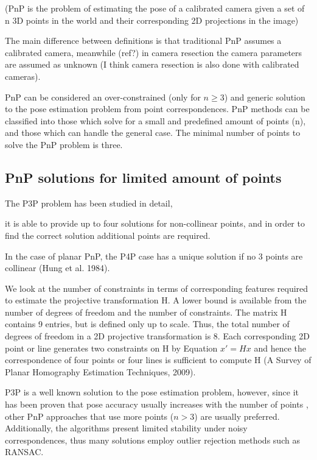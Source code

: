 \documentclass[letterpaper, 10 pt, conference]{ieeeconf}  %
\begin{document}
	(PnP is the problem of estimating the pose of a calibrated camera given a set of n 3D points in the world and their corresponding 2D projections in the image)
	
	The main difference between definitions is that traditional PnP assumes a calibrated camera, meanwhile (ref?) in camera resection the camera parameters are assumed as unknown (I think camera resection is also done with calibrated cameras). 
	
	PnP can be considered an over-constrained (only for $n \geq 3$) and generic solution to the pose estimation problem from point correspondences. PnP methods can be classified into those which solve for a small and predefined amount of points (n), and those which can handle the general case. The minimal number of points to solve the PnP problem is three.
	
	
	\subsection{PnP solutions for limited amount of points}
	The P3P problem has been studied in detail,
	
	
	it is able to provide up to four solutions for non-collinear points, and in order to find the correct solution additional points are required.
	
	
	In the case of planar PnP, the P4P case has a unique solution if no 3 points are collinear (Hung et al. 1984). 
	
	We look at the number of constraints in terms of
	corresponding features required to estimate the
	projective transformation H.  A lower bound
	is available from the number of degrees
	of freedom and the number of constraints.
	The matrix H contains 9 entries, but
	is defined only up to scale.
	Thus, the total number of degrees of freedom
	in a 2D projective transformation is 8.
	Each corresponding 2D point or line
	generates two constraints on H
	by Equation $x' = Hx$ and hence
	the correspondence of four points
	or four lines is sufficient to compute H (A Survey of Planar
	Homography Estimation Techniques, 2009). 
	
	P3P is a well known solution to the pose estimation problem, however, since it has been proven that pose accuracy usually increases with the number of points \cite{Marchand2016}, other PnP approaches that use more points ($n > 3$) are usually preferred. Additionally, the algorithms  present limited stability under noisy correspondences, thus many solutions employ outlier rejection methods such as RANSAC. 
	
\end{document}

